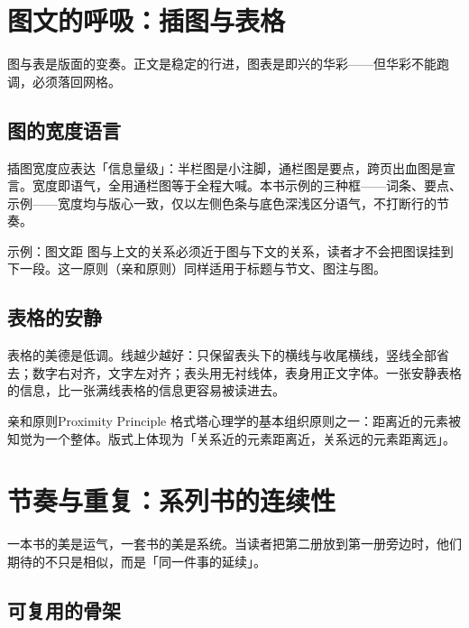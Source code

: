 \documentclass{bookedge}
\begin{document}
\chapter{图文的呼吸：插图与表格}

图与表是版面的变奏。正文是稳定的行进，图表是即兴的华彩——但华彩不能跑调，必须落回网格。

\section{图的宽度语言}

插图宽度应表达「信息量级」：半栏图是小注脚，通栏图是要点，跨页出血图是宣言。宽度即语气，全用通栏图等于全程大喊。本书示例的三种框——词条、要点、示例——宽度均与版心一致，仅以左侧色条与底色深浅区分语气，不打断行的节奏。

\begin{examplebox}{示例：图文距}
图与上文的关系必须近于图与下文的关系，读者才不会把图误挂到下一段。这一原则（亲和原则）同样适用于标题与节文、图注与图。
\end{examplebox}

\section{表格的安静}

表格的美德是低调。线越少越好：只保留表头下的横线与收尾横线，竖线全部省去；数字右对齐，文字左对齐；表头用无衬线体，表身用正文字体。一张安静表格的信息，比一张满线表格的信息更容易被读进去。

\begin{entry}{亲和原则}{Proximity Principle}
格式塔心理学的基本组织原则之一：距离近的元素被知觉为一个整体。版式上体现为「关系近的元素距离近，关系远的元素距离远」。
\end{entry}

\chapter{节奏与重复：系列书的连续性}

一本书的美是运气，一套书的美是系统。当读者把第二册放到第一册旁边时，他们期待的不只是相似，而是「同一件事的延续」。

\section{可复用的骨架}
\end{document}
